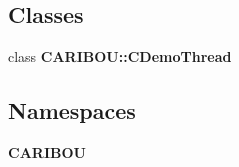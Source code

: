 \subsection*{Classes}
\begin{DoxyCompactItemize}
\item 
class {\bf C\+A\+R\+I\+B\+O\+U\+::\+C\+Demo\+Thread}
\end{DoxyCompactItemize}
\subsection*{Namespaces}
\begin{DoxyCompactItemize}
\item 
 {\bf C\+A\+R\+I\+B\+OU}
\end{DoxyCompactItemize}
